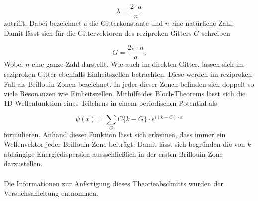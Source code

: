 \begin{equation}
  \label{eqn:e2ch4}
  \lambda = \frac{2\cdot a}{n}
\end{equation}
zutrifft. Dabei bezeichnet $a$ die Gitterkonstante und $n$ eine natürliche Zahl. Damit lässt sich für die
Gittervektoren des reziproken Gitters $G$ schreiben

\begin{equation}
  \label{eqn:e3ch4}
  G = \frac{2\pi \cdot n}{a}.
\end{equation}
Wobei $n$ eine ganze Zahl darstellt.
Wie auch im direkten Gitter, lassen sich im reziproken Gitter ebenfalls Einheitszellen betrachten. Diese
werden im reziproken Fall als Brillouin-Zonen bezeichnet. In jeder dieser Zonen befinden sich doppelt so viele
Resonanzen wie Einheitszellen. Mithilfe des Bloch-Theorems lässt sich die 1D-Wellenfunktion eines Teilchens
in einem periodischen Potential als

\begin{equation}
  \label{eqn:e4ch4}
  \psi(x) = \sum_{G} C\{k-G\} \cdot e^{i\left( k - G \right)\cdot x}
\end{equation}
formulieren. Anhand dieser Funktion lässt sich erkennen, dass immer ein Wellenvektor jeder Brillouin Zone
beiträgt. Damit lässt sich begründen die von $k$ abhängige Energiedispersion aussschließlich in der ersten
Brillouin-Zone darzustellen.\\ \\
Die Informationen zur Anfertigung dieses Theorieabschnitts wurden der Versuchsanleitung \cite{sample4}
entnommen.
